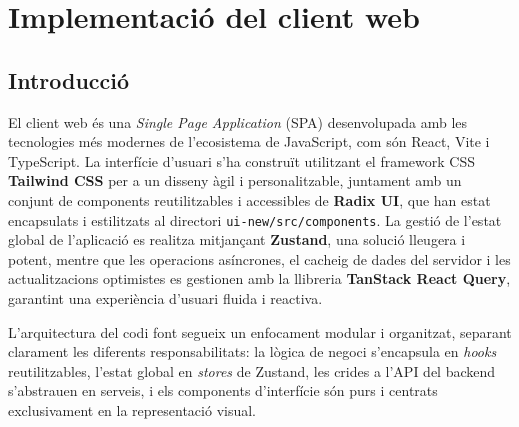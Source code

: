 \section{Implementació del client web}

\subsection{Introducció}
El client web és una \textit{Single Page Application} (SPA) desenvolupada amb les tecnologies més modernes de l'ecosistema de JavaScript, com són React, Vite i TypeScript. La interfície d'usuari s'ha construït utilitzant el framework CSS \textbf{Tailwind CSS} per a un disseny àgil i personalitzable, juntament amb un conjunt de components reutilitzables i accessibles de \textbf{Radix UI}, que han estat encapsulats i estilitzats al directori \texttt{ui-new/src/components}. La gestió de l'estat global de l'aplicació es realitza mitjançant \textbf{Zustand}, una solució lleugera i potent, mentre que les operacions asíncrones, el cacheig de dades del servidor i les actualitzacions optimistes es gestionen amb la llibreria \textbf{TanStack React Query}, garantint una experiència d'usuari fluida i reactiva.

L'arquitectura del codi font segueix un enfocament modular i organitzat, separant clarament les diferents responsabilitats: la lògica de negoci s'encapsula en \textit{hooks} reutilitzables, l'estat global en \textit{stores} de Zustand, les crides a l'API del backend s'abstrauen en serveis, i els components d'interfície són purs i centrats exclusivament en la representació visual.

